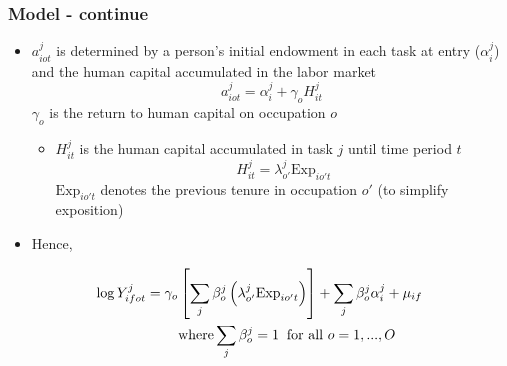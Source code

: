 \documentclass[11pt]{beamer}
\begin{document}
\begin{frame}
	\frametitle{Model - continue}
	\begin{itemize}
		\item $a_{iot}^j$ is determined by a person's initial endowment in each task at entry ($\alpha_{i}^j$)  and the human capital accumulated in the labor market
		\begin{equation}
			a_{iot}^j = \alpha_{i}^j + \gamma_o H^j_{it}
		\end{equation}
		\;\;	\;\;\;\;\;$\gamma_o$ is the return to human capital on occupation $o$ 
		\begin{itemize}
			\item $H_{it}^j$ is the human capital accumulated in task $j$ until time period $t$
			\begin{equation}
				H_{it}^j = \lambda_{o'}^j \text{Exp}_{io't}
			\end{equation}
			$\text{Exp}_{io't}$ denotes the previous tenure in occupation $o'$ (to simplify exposition)
		\end{itemize}
		\item Hence,
	\end{itemize}
	\begin{align}
		\log{Y_{ifot}^j} = \gamma_o&\left[ \sum_j \beta_{o}^j \left(\lambda_{o'}^j \text{Exp}_{io't} \right) \right] + \sum_j \beta_{o}^j \alpha_{i}^j + \mu_{if}\\
		&\text{where} \sum_{j} \beta_{o}^j = 1 \;\;\text{for all }o=1,...,O \notag
	\end{align}
\end{frame}
\end{document}
